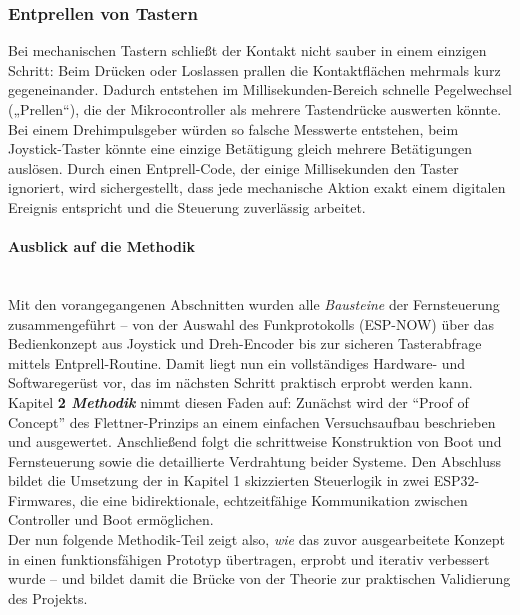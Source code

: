 \documentclass[a4paper,12pt]{article}
\begin{document}
\subsubsection{Entprellen von Tastern}

Bei mechanischen Tastern schließt der Kontakt nicht sauber in einem einzigen Schritt: Beim Drücken oder Loslassen prallen die Kontaktflächen mehrmals kurz gegeneinander. Dadurch entstehen im Millisekunden-Bereich schnelle Pegelwechsel („Prellen“), die der Mikrocontroller als mehrere Tastendrücke auswerten könnte. Bei einem Drehimpulsgeber würden so falsche Messwerte entstehen, beim Joystick-Taster könnte eine einzige Betätigung gleich mehrere Betätigungen auslösen. Durch einen Entprell-Code, der einige Millisekunden den Taster ignoriert, wird sichergestellt, dass jede mechanische Aktion exakt einem digitalen Ereignis entspricht und die Steuerung zuverlässig arbeitet.

\paragraph*{Ausblick auf die Methodik}\leavevmode\\

Mit den vorangegangenen Abschnitten wurden alle \emph{Bausteine} der Fernsteuerung zusammengeführt – von der Auswahl des Funkprotokolls (ESP-NOW) über das Bedienkonzept aus Joystick und Dreh-Encoder bis zur sicheren Tasterabfrage mittels Entprell-Routine. Damit liegt nun ein vollständiges Hardware- und Softwaregerüst vor, das im nächsten Schritt praktisch erprobt werden kann.
\\[1em]
Kapitel \textbf{2 \emph{Methodik}} nimmt diesen Faden auf: Zunächst wird der \enquote{Proof of Concept} des Flettner-Prinzips an einem einfachen Versuchsaufbau beschrieben und ausgewertet. Anschließend folgt die schrittweise Konstruktion von Boot und Fernsteuerung sowie die detaillierte Verdrahtung beider Systeme. Den Abschluss bildet die Umsetzung der in Kapitel 1 skizzierten Steuerlogik in zwei ESP32-Firmwares, die eine bidirektionale, echtzeitfähige Kommunikation zwischen Controller und Boot ermöglichen.
\\[1em]
Der nun folgende Methodik-Teil zeigt also, \emph{wie} das zuvor ausgearbeitete Konzept in einen funktionsfähigen Prototyp übertragen, erprobt und iterativ verbessert wurde – und bildet damit die Brücke von der Theorie zur praktischen Validierung des Projekts.

\newpage
\end{document}
